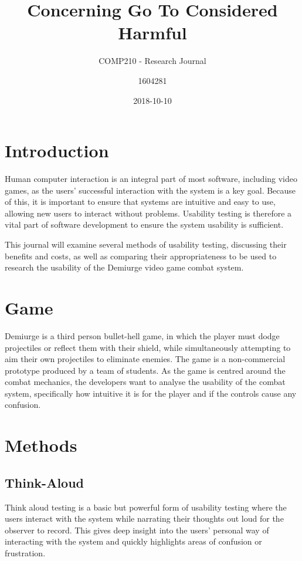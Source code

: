 \documentclass{scrartcl}
\title{Concerning Go To Considered Harmful}
\subtitle{COMP210 - Research Journal}
\date{2018-10-10}
\author{1604281}
\begin{document}
\maketitle
{}


\section{Introduction}
Human computer interaction is an integral part of most software, including video games, as the users' successful interaction with the system is a key goal. Because of this, it is important to ensure that systems are intuitive and easy to use, allowing new users to interact without problems. Usability testing is therefore a vital part of software development to ensure the system usability is sufficient. 

This journal will examine several methods of usability testing, discussing their benefits and costs, as well as comparing their appropriateness to be used to research the usability of the Demiurge video game combat system.

\section{Game}
Demiurge is a third person bullet-hell game, in which the player must dodge projectiles or reflect them with their shield, while simultaneously attempting to aim their own projectiles to eliminate enemies. The game is a non-commercial prototype produced by a team of students. As the game is centred around the combat mechanics, the developers want to analyse the usability of the combat system, specifically how intuitive it is for the player and if the controls cause any confusion.


\section{Methods}

\subsection{Think-Aloud}
Think aloud testing is a basic but powerful form of usability testing where the users interact with the system while narrating their thoughts out loud for the observer to record. \cite{usabilityEngineering} This gives deep insight into the users' personal way of interacting with the system and quickly highlights areas of confusion or frustration.
\end{document}

